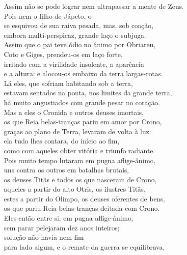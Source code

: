 \begin{pages}
\begin{Rightside}
\quad{}Assim não se pode lograr nem ultrapassar a mente de Zeus.\\
Pois nem o filho de Jápeto, o \\
se esquivou de sua raiva pesada, mas, sob coação, \\
embora multi-perspicaz, grande laço o subjuga.\\

\Para
Assim que o pai teve ódio no ânimo por Obriareu,\\
Coto e Giges, prendeu-os em laço forte,\\
irritado com a virilidade insolente, a aparência\\
e a altura; e alocou-os embaixo da terra largas-rotas. \\
Lá eles, que sofriam habitando sob a terra,\\
estavam sentados na ponta, nos limites da grande terra,\\
há muito angustiados com grande pesar no coração.\\
Mas a eles o Cronida e outros deuses imortais,\\
os que Reia belas-tranças pariu em amor por Crono, \\
graças ao plano de Terra, levaram de volta à luz:\\
ela tudo lhes contara, do início ao fim,\\
como com aqueles obter vitória e triunfo radiante.\\
Pois muito tempo lutaram em pugna aflige-ânimo,\\
uns contra os outros em batalhas brutais, \\
os deuses Titãs e todos os que nasceram de Crono, \\
aqueles a partir do alto Otris, os ilustres Titãs, \\
estes a partir do Olimpo, os deuses oferentes de bens,\\
os que pariu Reia belas-tranças deitada com Crono.\\
Eles então entre si, em pugna aflige-ânimo, \\
sem parar pelejaram dez anos inteiros;\\
solução não havia  nem fim\\
para lado algum, e o remate da guerra se equilibrava.\\


\end{Rightside}
\end{pages}

